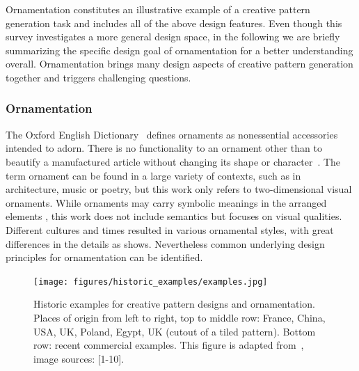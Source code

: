 Ornamentation constitutes an illustrative example of a creative pattern generation task and includes all of the above design features. Even though this survey investigates a more general design space, in the following we are briefly summarizing the specific design goal of ornamentation for a better understanding overall. Ornamentation brings many design aspects of creative pattern generation together and triggers challenging questions. 

\subsubsection{Ornamentation}
\label{subsubsec:ornamentation}



The Oxford English Dictionary~\cite{oed_2017} defines ornaments as nonessential accessories intended to adorn. There is no functionality to an ornament other than to beautify a manufactured article without changing its shape or character~\cite{ward_1896_tpo}. The term ornament can be found in a large variety of contexts, such as in architecture, music or poetry, but this work only refers to two-dimensional visual ornaments. While ornaments may carry symbolic meanings in the arranged elements \cite{wornum_1896_aof}, this work does not include semantics but focuses on visual qualities. Different cultures and times resulted in various ornamental styles, with great differences in the details as  shows. Nevertheless common underlying design principles for ornamentation can be identified.

\begin{figure}
       \texttt{[image: figures/historic\_examples/examples.jpg]}
        \caption[Historic pattern examples]{\label{fig:historic_examples} Historic examples for creative pattern designs and ornamentation. Places of origin from left to right, top to middle row:  France, China, USA, UK, Poland, Egypt, UK (cutout of a tiled pattern). Bottom row: recent commercial examples. This figure is adapted from~\cite{gieseke_2017_ooo}, image sources: [1-10].}
\end{figure}


